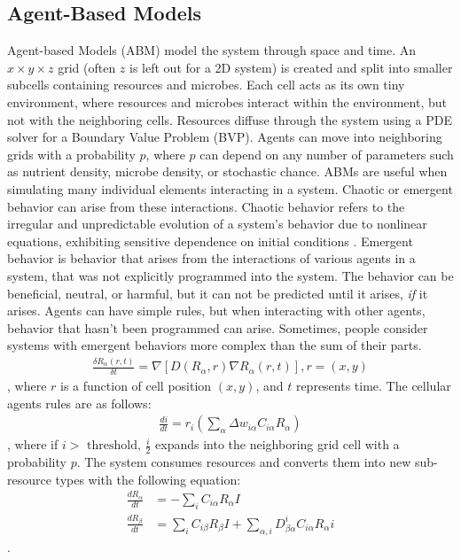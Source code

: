 \subsection{Agent-Based Models}
Agent-based Models (ABM) model the system through space and time.
An $x \times y \times z$ grid (often $z$ is left out for a 2D system) is created and split into smaller subcells containing resources and microbes.
Each cell acts as its own tiny environment, where resources and microbes interact within the environment, but not with the neighboring cells.
Resources diffuse through the system using a PDE solver for a Boundary Value Problem (BVP).
Agents can move into neighboring grids with a probability $p$, where $p$ can depend on any number of parameters such as nutrient density, microbe density, or stochastic chance. \newline 
ABMs are useful when simulating many individual elements interacting in a system.
Chaotic or emergent behavior can arise from these interactions.
Chaotic behavior refers to the irregular and unpredictable evolution of a system's behavior due to nonlinear equations, exhibiting sensitive dependence on initial conditions \cite{encyclopedia_of_physical_science_and_technology}. \newline 
Emergent behavior is behavior that arises from the interactions of various agents in a system, that was not explicitly programmed into the system.
The behavior can be beneficial, neutral, or harmful, but it can not be predicted until it arises, \textit{if} it arises.
Agents can have simple rules, but when interacting with other agents, behavior that hasn't been programmed can arise.
Sometimes, people consider systems with emergent behaviors more complex than the sum of their parts. \newline
\begin{align} 
    \frac{\delta R_\alpha(r, t)}{\delta t} = \nabla \left[D \left( R_\alpha, r\right) \nabla R_\alpha \left( r, t \right) \right], r = \left(x, y\right)
\end{align}, where $r$ is a function of cell position $(x, y)$, and $t$ represents time. 
The cellular agents rules are as follows: 
\begin{align} 
    \frac{di}{dt} = r_i \left( \sum_\alpha \Delta w_{i\alpha}C_{i\alpha}R_\alpha\right)
\end{align}, where if $i> \text{ threshold, }\frac{i}{2}$ expands into the neighboring grid cell with a probability $p$. 
The system consumes resources and converts them into new sub-resource types with the following equation:
\begin{align} 
    \frac{dR_\alpha}{dt} &= -\sum_i C_{i\alpha}R_\alpha I \\
    \frac{dR_\beta}{dt} &= \sum_i C_{i\beta}R_\beta I + \sum_{\alpha, i}D_{\beta \alpha}^{i} C_{i \alpha} R_\alpha i
\end{align}. 

